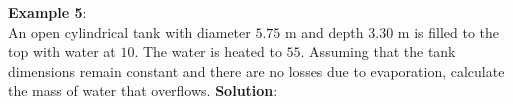 \documentclass[10pt]{amsart}
\begin{document}
\begin{minipage}[c]{0.45\textwidth}
\raggedright
\textbf{Example 5}:\\
An open cylindrical tank with diameter $5.75$ m and depth $3.30$ m is filled to the top with water at $10$\textcelsius.
The water is heated to $55$\textcelsius. Assuming that the tank dimensions remain constant and there are no losses due to evaporation, calculate the mass of water that overflows.
\parb
\textbf{Solution}:
%
\end{minipage}
\newpage

\end{document}
